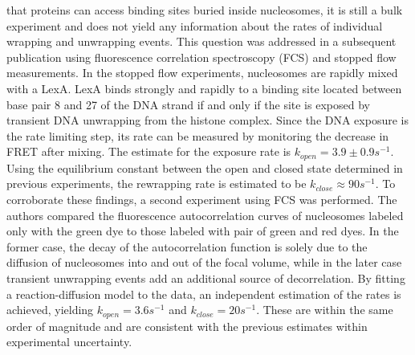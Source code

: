 that proteins can access binding sites buried inside nucleosomes, 
it is still a bulk experiment and does not yield any information about the rates of individual wrapping 
and unwrapping events. This question was addressed in a subsequent publication \cite{Li_NatureStructMolBio_05} 
using fluorescence correlation spectroscopy (FCS) and stopped
flow measurements. In the stopped flow experiments, nucleosomes are 
rapidly mixed with a LexA. LexA binds strongly and rapidly to a binding site located between
base pair 8 and 27 of the DNA strand if and only if the site is exposed by transient DNA unwrapping from the
histone complex. Since the DNA exposure is the rate limiting step, its rate can 
be measured by monitoring the decrease in FRET after mixing. The estimate for the exposure rate
is $k_{open}=3.9\pm0.9 s^{-1}$.  Using the equilibrium constant between the open and closed state determined 
in previous experiments,  the rewrapping rate
is estimated to be $k_{close}\approx90s^{-1}$. To corroborate these findings, a second experiment 
using FCS was performed. The authors compared the fluorescence autocorrelation
curves of nucleosomes labeled only with the green dye to those labeled with pair of green and red dyes. In the former
case, the decay of the autocorrelation function is solely due to the diffusion of nucleosomes into and out of
the focal volume, while in the later case transient unwrapping events add an additional source of decorrelation.
By fitting a reaction-diffusion model to the data, an independent estimation of the rates is achieved, yielding
$k_{open}=3.6s^{-1}$ and $k_{close}=20s^{-1}$. These are within the same order of magnitude and 
are consistent with the previous estimates within experimental uncertainty.

